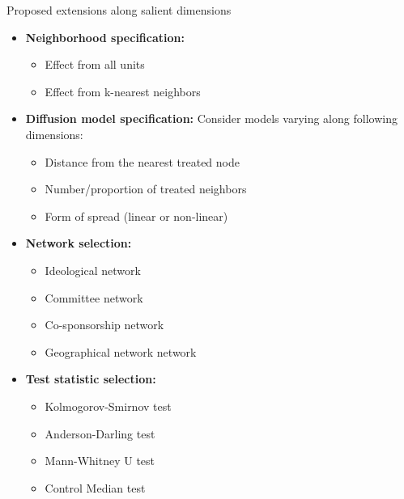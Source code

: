 \documentclass[final]{beamer}
\newlength{\onecolwid}
\newlength{\onecolwidd}
\begin{document}
\begin{frame}[t]
\begin{columns}[t]
\begin{column}{\onecolwidd}
\begin{block}{Proposed extensions along salient dimensions}
\begin{rmfamily}
\begin{itemize}
	\item \textbf{Neighborhood specification:}
		\begin{multicols}{2}
		\begin{itemize}
		\item Effect from all units
		\item Effect from k-nearest neighbors 
		\end{itemize}
		\end{multicols}
		\vspace*{.02in}
	\item \textbf{Diffusion model specification:} Consider models varying along following dimensions:
		\begin{multicols}{2}
		\begin{itemize}
		\item Distance from the nearest treated node
		\item Number/proportion of treated neighbors
		\item Form of spread (linear or non-linear)
		\end{itemize}
		\end{multicols}
		\vspace*{.02in}
	\item \textbf{Network selection:}
		\begin{multicols}{2}
		\begin{itemize}
		\item Ideological network
		\item Committee network
		\item Co-sponsorship network
		\item Geographical network network
		\end{itemize}
		\end{multicols}
		\vspace*{.02in}	
	\item \textbf{Test statistic selection:}
		\begin{multicols}{2}
		\begin{itemize}
		\item Kolmogorov-Smirnov test
		\item Anderson-Darling test
		\item Mann-Whitney U test
		\item Control Median test
		\end{itemize}
		\end{multicols}
		\vspace*{.02in}
	\end{itemize}	


\end{rmfamily}
\end{block}
\end{column}
\end{columns}
\end{frame}
\end{document}
